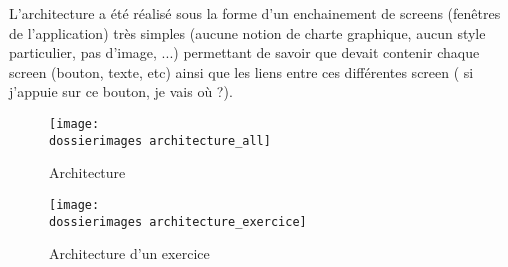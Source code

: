L'architecture a été réalisé sous la forme d'un enchainement de screens (fenêtres de l'application) très simples (aucune notion de charte graphique, aucun style particulier, pas d'image, ...) permettant de savoir que devait contenir chaque screen (bouton, texte, etc) ainsi que les liens entre ces différentes screen (\og{} si j'appuie sur ce bouton, je vais où ?\fg{}).


\begin{figure}[htp]
	\label{architecture_all}
	\centering
	\texttt{[image: \\dossierimages architecture\_all]}
	\caption{Architecture}
\end{figure}

\begin{figure}[htp]
	\label{architecture_exercice}
	\centering
	\texttt{[image: \\dossierimages architecture\_exercice]}
	\caption{Architecture d'un exercice}
\end{figure}